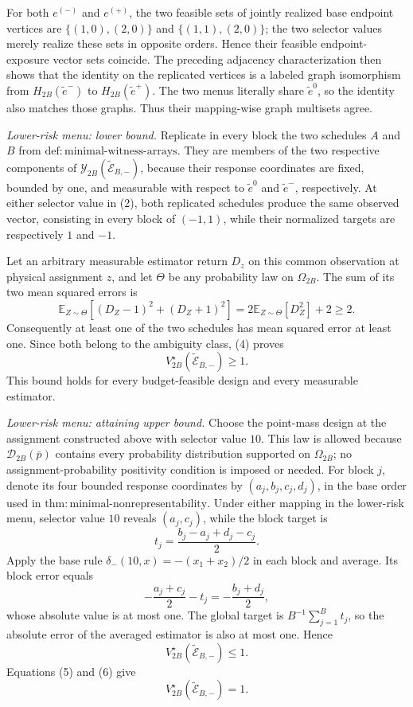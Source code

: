 For both \(e^{(-)}\) and \(e^{(+)}\), the two feasible sets of jointly realized base endpoint vertices are \(\{(1,0),(2,0)\}\) and \(\{(1,1),(2,0)\}\); the two selector values merely realize these sets in opposite orders.  Hence their feasible endpoint-exposure vector sets coincide.  The preceding adjacency characterization then shows that the identity on the replicated vertices is a labeled graph isomorphism from \(H_{2B}(\widetilde e^-)\) to \(H_{2B}(\widetilde e^+)\).  The two menus literally share \(\widetilde e^0\), so the identity also matches those graphs.  Thus their mapping-wise graph multisets agree.

\emph{Lower-risk menu: lower bound.}
Replicate in every block the two schedules \(A\) and \(B\) from \(\mathrm{def{:}minimal\text{-}witness\text{-}arrays}\).  They are members of the two respective components of \(\mathcal Y_{2B}(\widetilde{\mathcal E}_{B,-})\), because their response coordinates are fixed, bounded by one, and measurable with respect to \(\widetilde e^0\) and \(\widetilde e^-\), respectively.  At either selector value in (2), both replicated schedules produce the same observed vector, consisting in every block of \((-1,1)\), while their normalized targets are respectively \(1\) and \(-1\).

Let an arbitrary measurable estimator return \(D_z\) on this common observation at physical assignment \(z\), and let \(\Theta\) be any probability law on \(\Omega_{2B}\).  The sum of its two mean squared errors is
\[
 \mathbb E_{Z\sim\Theta}\!\left[(D_Z-1)^2+(D_Z+1)^2\right]
 =2\mathbb E_{Z\sim\Theta}[D_Z^2]+2
 \ge2. \tag{4}
\]
Consequently at least one of the two schedules has mean squared error at least one.  Since both belong to the ambiguity class, (4) proves
\[
 V_{2B}^\star(\widetilde{\mathcal E}_{B,-})\ge1. \tag{5}
\]
This bound holds for every budget-feasible design and every measurable estimator.

\emph{Lower-risk menu: attaining upper bound.}
Choose the point-mass design at the assignment constructed above with selector value \(10\).  This law is allowed because \(\mathcal D_{2B}(\bar p)\) contains every probability distribution supported on \(\Omega_{2B}\); no assignment-probability positivity condition is imposed or needed.  For block \(j\), denote its four bounded response coordinates by \((a_j,b_j,c_j,d_j)\), in the base order used in \(\mathrm{thm{:}minimal\text{-}nonrepresentability}\).  Under either mapping in the lower-risk menu, selector value \(10\) reveals \((a_j,c_j)\), while the block target is
\[
 t_j=\frac{b_j-a_j+d_j-c_j}{2}.
\]
Apply the base rule \(\delta_-(10,x)=-(x_1+x_2)/2\) in each block and average.  Its block error equals
\[
 -\frac{a_j+c_j}{2}-t_j=-\frac{b_j+d_j}{2},
\]
whose absolute value is at most one.  The global target is \(B^{-1}\sum_{j=1}^B t_j\), so the absolute error of the averaged estimator is also at most one.  Hence
\[
 V_{2B}^\star(\widetilde{\mathcal E}_{B,-})\le1. \tag{6}
\]
Equations (5) and (6) give
\[
 V_{2B}^\star(\widetilde{\mathcal E}_{B,-})=1. \tag{7}
\]

